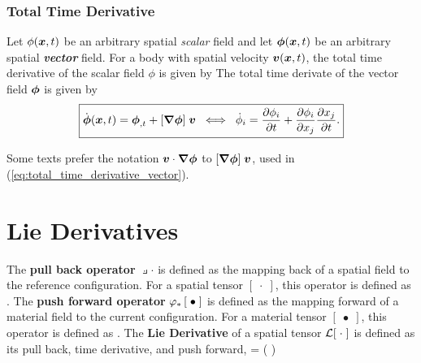 \subsubsection{Total Time Derivative}
Let $\phi(\mbox{\boldmath $x$},t)$ be an arbitrary spatial {\em scalar} field and let $\mbox{\boldmath $\phi$}(\mbox{\boldmath $x$},t)$ be an arbitrary spatial {\bf \em vector} field.  For a body with spatial velocity $\mbox{\boldmath $v$}(\mbox{\boldmath $x$}, t)$, the total time derivative of the scalar field $\phi$ is given by
\be
{}
 \label{eq:total_time_derivative_scalar}
\ee
The total time derivate of the vector field $\mbox{\boldmath $\phi$}$ is given by
\begin{equation}
\boxed{
 \dot{\mbox{\boldmath $\phi$}}(\mbox{\boldmath $x$}, t) = 
 \mbox{\boldmath $\phi$}_{,t} 
 + [\mbox{\boldmath $\nabla$} \mbox{\boldmath $\phi$}] \; \mbox{\boldmath $v$}
\;\; \Longleftrightarrow \;\;
 \dot{\phi}_i 
 = 
 \frac{\partial \phi_i}{\partial t} 
 + 
 \frac{\partial \phi_i}{\partial x_j} \frac{\partial x_j}{\partial t}.
 \label{eq:total_time_derivative_vector}
}
\end{equation}

\begin{Hremark}
Some texts prefer the notation $\mbox{\boldmath $v$} \cdot \mbox{\boldmath $\nabla$} \mbox{\boldmath $\phi$}$ to
$[\mbox{\boldmath $\nabla$} \mbox{\boldmath $\phi$}] \; \mbox{\boldmath $v$}$, used in 
(\ref{eq:total_time_derivative_vector}).
\end{Hremark}

\clearpage
\section{Lie Derivatives}
The {\bf pull back operator} $\pullback{\cdot}$ is defined as the mapping back of a spatial field to the reference configuration.  For a spatial tensor $[\;\cdot\;]$, this operator is defined as 
\be
\pullback{\cdot}  \tFbold\transpose \;[\;\cdot\;]\; \tFbold.
\ee
The {\bf push forward operator} $\varphi_*\left[\;\bullet\;\right]$ is defined as the mapping forward of a material field to the current configuration.  For a material tensor $[\;\bullet\;]$, this operator is defined as 
\be
\pushforward{\bullet}  \tFbold\minustranspose \;[\;\bullet\;]\; \tFbold\inverse.
\ee
The {\bf Lie Derivative} of a spatial tensor $\mathcal L[\;\cdot\;]$ is defined as its pull back, time derivative, and push forward,
\be
    \lie{\cdot}  {} = \tFbold\minustranspose \; \dst{} 
\left( 
\tFbold\transpose \;[\; \cdot \;]\; \tFbold
\right) \tFbold\inverse
\label{eq:lie_derivative}
\ee

